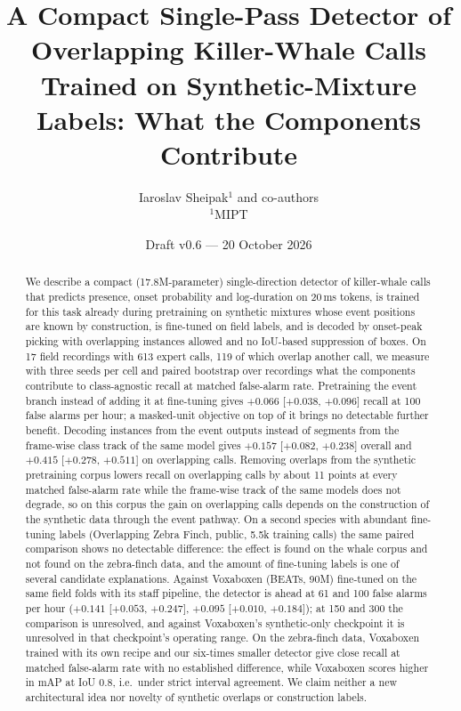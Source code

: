 \documentclass[10pt,twocolumn]{article}
\title{A Compact Single-Pass Detector of Overlapping Killer-Whale Calls\\Trained on Synthetic-Mixture Labels: What the Components Contribute}
\author{Iaroslav Sheipak$^{1}$ and co-authors \\[2pt] \small $^1$MIPT}
\date{Draft v0.6 --- 20 October 2026}
\begin{document}
\maketitle

\begin{abstract}
We describe a compact (17.8M-parameter) single-direction detector of killer-whale calls that predicts presence, onset probability and log-duration on 20\,ms tokens, is trained for this task already during pretraining on synthetic mixtures whose event positions are known by construction, is fine-tuned on field labels, and is decoded by onset-peak picking with overlapping instances allowed and no IoU-based suppression of boxes. On 17 field recordings with 613 expert calls, 119 of which overlap another call, we measure with three seeds per cell and paired bootstrap over recordings what the components contribute to class-agnostic recall at matched false-alarm rate. Pretraining the event branch instead of adding it at fine-tuning gives $+0.066$ [$+0.038$, $+0.096$] recall at 100 false alarms per hour; a masked-unit objective on top of it brings no detectable further benefit. Decoding instances from the event outputs instead of segments from the frame-wise class track of the same model gives $+0.157$ [$+0.082$, $+0.238$] overall and $+0.415$ [$+0.278$, $+0.511$] on overlapping calls. Removing overlaps from the synthetic pretraining corpus lowers recall on overlapping calls by about 11 points at every matched false-alarm rate while the frame-wise track of the same models does not degrade, so on this corpus the gain on overlapping calls depends on the construction of the synthetic data through the event pathway. On a second species with abundant fine-tuning labels (Overlapping Zebra Finch, public, 5.5k training calls) the same paired comparison shows no detectable difference: the effect is found on the whale corpus and not found on the zebra-finch data, and the amount of fine-tuning labels is one of several candidate explanations. Against Voxaboxen (BEATs, 90M) fine-tuned on the same field folds with its staff pipeline, the detector is ahead at 61 and 100 false alarms per hour ($+0.141$ [$+0.053$, $+0.247$], $+0.095$ [$+0.010$, $+0.184$]); at 150 and 300 the comparison is unresolved, and against Voxaboxen's synthetic-only checkpoint it is unresolved in that checkpoint's operating range. On the zebra-finch data, Voxaboxen trained with its own recipe and our six-times smaller detector give close recall at matched false-alarm rate with no established difference, while Voxaboxen scores higher in mAP at IoU 0.8, i.e.\ under strict interval agreement. We claim neither a new architectural idea nor novelty of synthetic overlaps or construction labels.
\end{abstract}
\end{document}
